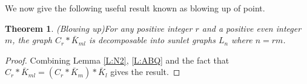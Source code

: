 \documentclass[12pt]{report}
\newtheorem{thm}{Theorem}[section]
\begin{document}
We now give the following useful result known as blowing up of point.
\begin{thm} (Blowing up)\label{T:N9}
For any positive integer $r$ and a positive even integer $m$, the
graph $C_{r}*\bar{K}_{ml}$ is decomposable into sunlet graphs $L_n$
where $n=rm$.
\end{thm}
\begin{proof}
Combining Lemma \ref{L:N2}, \ref{L:ABQ} and the fact that
$C_{r}*\bar{K}_{ml}=(C_r*\bar{K}_m)*\bar{K}_l$ gives the result.
\end{proof}
\end{document}
